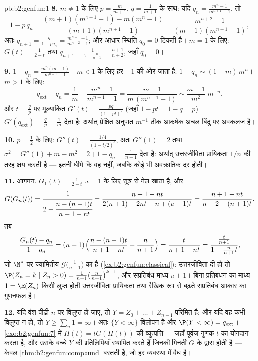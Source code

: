 \begin{solution}{pb:b2:genfun:1}
\textbf{8.} $m \neq 1$ के लिए $p = \frac m{m+1}$, $q =
\frac1{m+1}$ के साथ: यदि $q_n = \frac{m^n - 1}{m^{n+1} - 1}$, तो
\[
1 - p\,q_n = \frac{(m+1)(m^{n+1} - 1) - m(m^n - 1)}
{(m+1)(m^{n+1} - 1)} = \frac{m^{n+2} - 1}{(m+1)(m^{n+1} -
1)},
\]
अतः $q_{n+1} = \frac{q}{1 - pq_n} = \frac{m^{n+1} -
1}{m^{n+2} - 1}$; और आधार स्थिति $q_0 = 0$ टिकती है। $m = 1$ के लिए: $G(t) = \frac1{2 - t}$ तथा $q_{n+1} = \frac1{2 -
\frac{n}{n+1}} = \frac{n+1}{n+2}$,
जहाँ $q_0 = 0$।

\textbf{9.} $1 - q_n = \frac{m^n(m - 1)}{m^{n+1} - 1}$। $m < 1$ के लिए हर $-1$ की ओर जाता है: $1 - q_n \sim (1 -
m)\,m^n$। $m > 1$ के लिए:
\[
q_{\mathrm{ext}} - q_n = \frac1m - \frac{m^n - 1}{m^{n+1} -
1} = \frac{m - 1}{m\,(m^{n+1} - 1)} \sim \frac{m -
1}{m^{2}}\;m^{-n} .
\]
और $t = \frac
qp$ पर मूल्यांकित $G'(t) = \frac{pq}{(1 - pt)^2}$ (जहाँ $1 - pt = 1 - q = p$) $G'(q_{\mathrm{ext}})
= \frac qp = \frac1m$ देता है: अर्थात् प्रेक्षित
अनुपात $m^{-1}$ ठीक आकर्षक अचल बिंदु पर अवकलज है।

\textbf{10.} $p = \frac12$ के लिए: $G''(t) = \frac{1/4}{(1 -
t/2)^3}$, अतः $G''(1) = 2$ तथा $\sigma^2 = G''(1) + m - m^2 =
2$।  $1 - q_n = \frac1{n+1}$ देता
है: अर्थात् उत्तरजीविता प्रायिकता $1/n$ की तरह क्षय करती है --- इतनी
धीमे कि वह  नहीं, जबकि कोई भी अवक्रांतिक दर होती।

\textbf{11.} आगमन: $G_1(t) = \frac1{2-t}$ $n = 1$ के लिए सूत्र से मेल खाता है, और
\[
G(G_n(t)) = \cfrac{1}{2 - \cfrac{n - (n-1)t}{n+1 - nt}}
= \frac{n + 1 - nt}{2(n+1) - 2nt - n + (n-1)t}
= \frac{n+1 - nt}{n + 2 - (n+1)t} .
\]
तब
\[
\frac{G_n(t) - q_n}{1 - q_n}
= (n+1)\,\Bigl(\frac{n - (n-1)t}{n+1 - nt} -
\frac{n}{n+1}\Bigr)
= \frac{t}{n + 1 - nt}
= \frac{\frac{t}{n+1}}{1 - \frac{n}{n+1}t} ,
\]
जो $\N^*$ पर ज्यामितीय  $\mathcal G\bigl(\frac1{n+1}
\bigr)$ का  है (\cref{ex:b2:genfun:classical}): उत्तरजीविता दी
हो तो $\P(Z_n = k \mid Z_n > 0) =
\frac1{n+1}\bigl(\frac n{n+1}\bigr)^{k-1}$, और सप्रतिबंध माध्य $n + 1$। बिना प्रतिबंधन का माध्य $1 = \E(Z_n)$
किसी लुप्त होती उत्तरजीविता प्रायिकता तथा रैखिक रूप से बढ़ते
सप्रतिबंध आकार का गुणनफल है।

\textbf{12.} यदि वंश पीढ़ी $n$ पर विलुप्त हो जाए, तो $Y = Z_0 + \dots + Z_{n-1}$ परिमित
है; और यदि वह कभी विलुप्त न हो, तो $Y \geq \sum_n 1 = \infty$। अतः $\{Y < \infty\}$ विलोपन  है और
$\P(Y < \infty) = q_{\mathrm{ext}}$। \cref{exo:b2:genfun:7} में $H(t) = tG(H(t))$ की व्युत्पत्ति --- जहाँ पूर्वज गुणक $t$ का योगदान
करता है, और उसके बच्चे $Y$ की  प्रतिलिपियाँ स्थापित करते
हैं जिनकी गिनती $G$ के द्वारा होती है --- केवल
\cref{thm:b2:genfun:compound} बरतती है, जो हर व्यवस्था में वैध है।


\end{solution}
